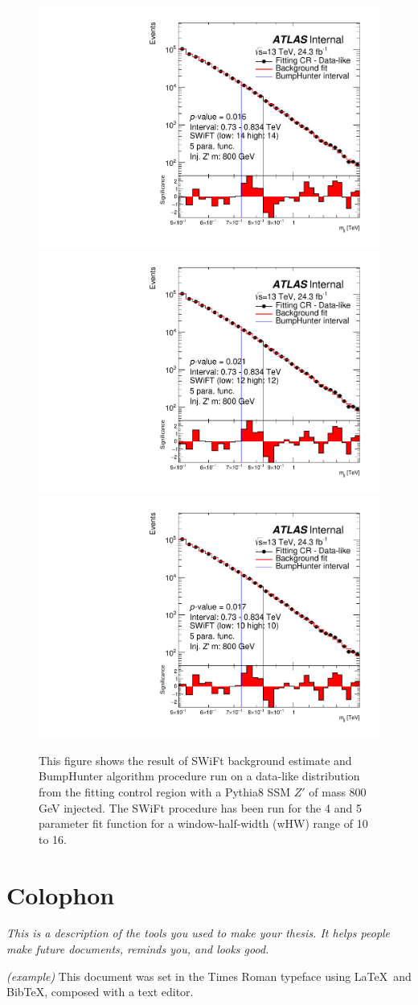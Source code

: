 \begin{figure}[!htb]
{}
 {
  \includegraphics[width=0.3\linewidth, angle=0]{figs/Dibjet/LowMass/FitStudy/bhFit_corrFitCR_dataLike_5para_low14_high14_inj_Zprimebb800_xsFactor1.pdf}
}\\
 {
  \includegraphics[width=0.3\linewidth, angle=0]{figs/Dibjet/LowMass/FitStudy/bhFit_corrFitCR_dataLike_5para_low12_high12_inj_Zprimebb800_xsFactor1.pdf}
}
 {
  \includegraphics[width=0.3\linewidth, angle=0]{figs/Dibjet/LowMass/FitStudy/bhFit_corrFitCR_dataLike_5para_low10_high10_inj_Zprimebb800_xsFactor1.pdf}
}
\vspace{10pt}
\caption{\label{fig:app-bhFit_lm_corrFitCR_dataLike_inj_Zprimebb800_xsFactor1}
  This figure shows the result of SWiFt background estimate and {\sc BumpHunter} algorithm procedure run on a data-like distribution
  from the fitting control region with a Pythia8 SSM $Z'$ of mass 800 GeV injected.
  The SWiFt procedure has been run for the 4 and 5 parameter fit function for a window-half-width (wHW) range of 10 to 16.
}
\end{figure}



\chapter{Colophon}
\label{appendixlabel3}
\textit{This is a description of the tools you used to make your thesis. It helps people make future documents, reminds you, and looks good.}

\textit{(example)} This document was set in the Times Roman typeface using \LaTeX\ and Bib\TeX , composed with a text editor. 


